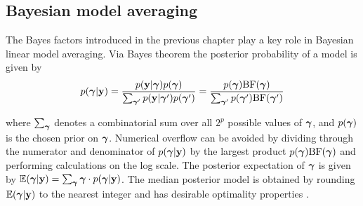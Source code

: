 





\subsection{Bayesian model averaging}


The Bayes factors introduced in the previous chapter play a key role in Bayesian linear model averaging.
Via Bayes theorem the posterior
probability of a model is given by
$$
\displaystyle p({\boldsymbol \gamma}|{\bf y}) = \frac{p({\bf y}|{\boldsymbol \gamma})p({\boldsymbol \gamma})}{\sum_{{\boldsymbol \gamma}'} p({\bf y}|{\boldsymbol \gamma}')p({\boldsymbol \gamma}')} = \frac{p({\boldsymbol \gamma})\mbox{BF}({\boldsymbol \gamma})}{\sum_{{\boldsymbol \gamma}'} p({\boldsymbol \gamma}')\mbox{BF}({\boldsymbol \gamma}')}
$$

\noindent where $\sum_{{\boldsymbol \gamma}}$ denotes a combinatorial sum over all
$2^p$ possible values of ${\boldsymbol \gamma}$, and $p({\boldsymbol \gamma})$ is
the chosen prior on ${\boldsymbol \gamma}$. Numerical overflow can be avoided by dividing
through the numerator and denominator of $p({\boldsymbol \gamma}|{\bf y})$ by the largest
product $p({\boldsymbol \gamma})\mbox{BF}({\boldsymbol \gamma})$ and performing calculations  on the log scale.
The 
posterior expectation of ${\boldsymbol \gamma}$ is given by
${\mathbb E}({\boldsymbol \gamma}|{\bf y}) = \sum_{{\boldsymbol \gamma}} {\boldsymbol \gamma} \cdot p({\boldsymbol \gamma}|{\bf y})$.
The
median posterior model  is obtained by
rounding ${\mathbb E}({\boldsymbol \gamma}|{\bf y})$ to the nearest integer and has desirable
optimality properties \citep{Barbieri2004}.
 
